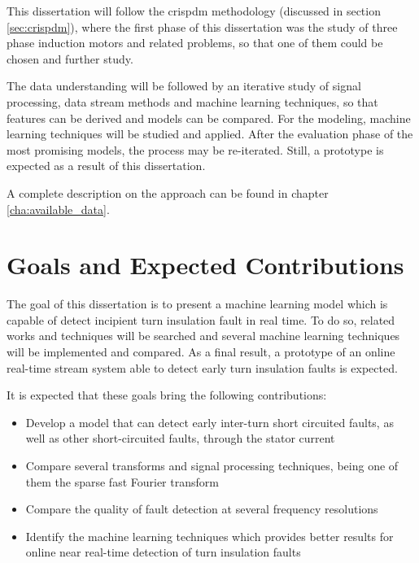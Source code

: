 This dissertation will follow the \acrlong{crispdm} methodology (discussed in section \ref{sec:crispdm}), where the first phase of this dissertation was the study of three phase induction motors and related problems, so that one of them could be chosen and further study. 

The data understanding will be followed by an iterative study of signal processing, data stream methods and machine learning techniques, so that features can be derived and models can be compared.
For the modeling, machine learning techniques will be studied and applied.
After the evaluation phase of the most promising models, the process may be re-iterated. Still, a prototype is expected as a result of this dissertation.

A complete description on the approach can be found in chapter \ref{cha:available_data}.





\section{Goals and Expected Contributions} %
\label{sec:contributions}

The goal of this dissertation is to present a machine learning model which is capable of detect incipient turn insulation fault in real time. To do so, related works and techniques will be searched and several machine learning techniques will be implemented and compared. As a final result, a prototype of an online real-time stream system able to detect early turn insulation faults is expected.

It is expected that these goals bring the following contributions:


\begin{itemize}
  \item 
  Develop a model that can detect early inter-turn short circuited faults, as well as other short-circuited faults, through the stator current
  \item 
  Compare several transforms and signal processing techniques, being one of them the sparse fast Fourier transform  ~\cite{Indyk2014,Hassanieh2014}
  \item 
  Compare the quality of fault detection at several frequency resolutions
  \item 
  Identify the machine learning techniques which provides better results for online near real-time detection of turn insulation faults
\end{itemize}


